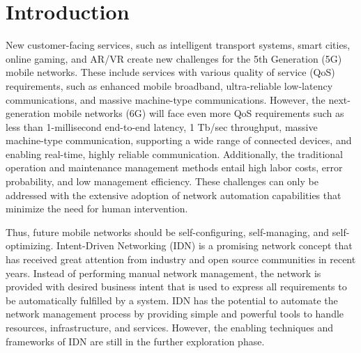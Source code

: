 

\usepackage{xcolor} 
\usepackage{listings}





\tableofcontents

\clearpage
{}

\section{Introduction}
\label{sec:Introduction}

New customer-facing services, such as intelligent transport systems, smart cities, online gaming, and AR/VR create new challenges for the 5th Generation (5G) mobile networks. These include services with various quality of service (QoS) requirements, such as enhanced mobile broadband, ultra-reliable low-latency communications, and massive machine-type communications. However, the next-generation mobile networks (6G) will face even more QoS requirements such as less than 1-millisecond end-to-end latency, 1 Tb/sec throughput,  massive machine-type communication, supporting a wide range of connected devices, and enabling real-time, highly reliable communication\cite{Han2021, Docomo2020}. Additionally, the traditional operation and maintenance management methods entail high labor costs, error probability, and low management efficiency. These challenges can only be addressed with the extensive adoption of network automation capabilities that minimize the need for human intervention. 

Thus, future mobile networks should be self-configuring, self-managing, and self-optimizing. Intent-Driven Networking (IDN) is a promising network concept that has received great attention from industry and open source communities in recent years. Instead of performing manual network management, the network is provided with desired business intent that is used to express all requirements to be automatically fulfilled by a system. IDN has the potential to automate the network management process by providing simple and powerful tools to handle resources, infrastructure, and services\cite{Mwanje2021}. However, the enabling techniques and frameworks of IDN are still in the further exploration phase.

